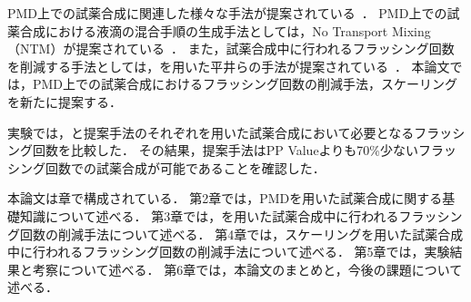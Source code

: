     PMD上での試薬合成に関連した様々な手法が提案されている~\cite{bhattacharjee2022algorithms}．
    PMD上での試薬合成における液滴の混合手順の生成手法としては，No Transport Mixing（NTM）が提案されている~\cite{4}．
    また，試薬合成中に行われるフラッシング回数を削減する手法としては，を用いた平井らの手法が提案されている~\cite{10089903}．
    本論文では，PMD上での試薬合成におけるフラッシング回数の削減手法，スケーリングを新たに提案する．

    実験では，と提案手法のそれぞれを用いた試薬合成において必要となるフラッシング回数を比較した．
    その結果，提案手法はPP Valueよりも70\%少ないフラッシング回数での試薬合成が可能であることを確認した．
    
    本論文は章で構成されている．
    第2章では，PMDを用いた試薬合成に関する基礎知識について述べる．
    第3章では，を用いた試薬合成中に行われるフラッシング回数の削減手法について述べる．
    第4章では，スケーリングを用いた試薬合成中に行われるフラッシング回数の削減手法について述べる．
    第5章では，実験結果と考察について述べる．
    第6章では，本論文のまとめと，今後の課題について述べる．

